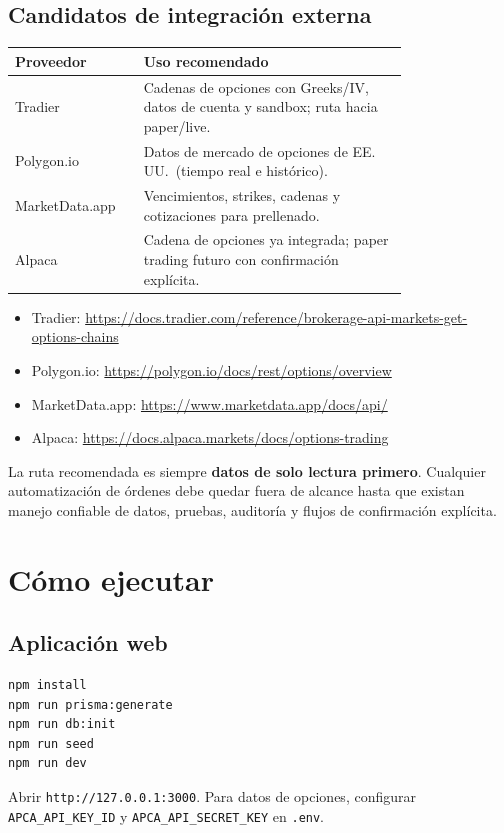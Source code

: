 \documentclass[11pt,letterpaper]{article}
\begin{document}
\subsection{Candidatos de integración externa}

\begin{longtable}{p{0.20\linewidth} p{0.58\linewidth}}
\toprule
\textbf{Proveedor} & \textbf{Uso recomendado} \\
\midrule
Tradier & Cadenas de opciones con Greeks/IV, datos de cuenta y sandbox; ruta hacia paper/live. \\
Polygon.io & Datos de mercado de opciones de EE.\,UU.\ (tiempo real e histórico). \\
MarketData.app & Vencimientos, strikes, cadenas y cotizaciones para prellenado. \\
Alpaca & Cadena de opciones ya integrada; paper trading futuro con confirmación explícita. \\
\bottomrule
\end{longtable}

\begin{itemize}[noitemsep]
  \item Tradier: \url{https://docs.tradier.com/reference/brokerage-api-markets-get-options-chains}
  \item Polygon.io: \url{https://polygon.io/docs/rest/options/overview}
  \item MarketData.app: \url{https://www.marketdata.app/docs/api/}
  \item Alpaca: \url{https://docs.alpaca.markets/docs/options-trading}
\end{itemize}

\noindent
La ruta recomendada es siempre \textbf{datos de solo lectura primero}. Cualquier
automatización de órdenes debe quedar fuera de alcance hasta que existan manejo
confiable de datos, pruebas, auditoría y flujos de confirmación explícita.

\section{Cómo ejecutar}

\subsection{Aplicación web}
\begin{lstlisting}
npm install
npm run prisma:generate
npm run db:init
npm run seed
npm run dev
\end{lstlisting}
Abrir \texttt{http://127.0.0.1:3000}. Para datos de opciones, configurar
\texttt{APCA\_API\_KEY\_ID} y \texttt{APCA\_API\_SECRET\_KEY} en \texttt{.env}.
\end{document}
